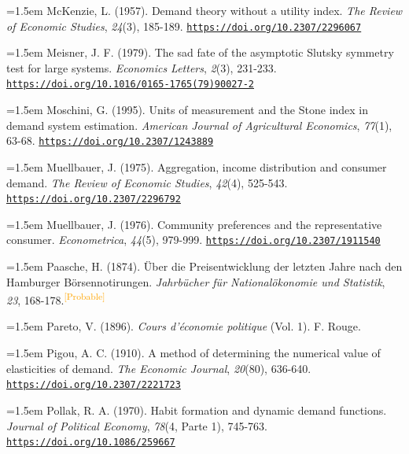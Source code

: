 \documentclass[10pt,a4paper]{article}
\begin{document}
\noindent\hangindent=1.5em McKenzie, L. (1957). Demand theory without a utility index. \textit{The Review of Economic Studies}, \textit{24}(3), 185-189. \href{https://doi.org/10.2307/2296067}{\nolinkurl{https://doi.org/10.2307/2296067}}

\noindent\hangindent=1.5em Meisner, J. F. (1979). The sad fate of the asymptotic Slutsky symmetry test for large systems. \textit{Economics Letters}, \textit{2}(3), 231-233. \href{https://doi.org/10.1016/0165-1765(79)90027-2}{\nolinkurl{https://doi.org/10.1016/0165-1765(79)90027-2}}

\noindent\hangindent=1.5em Moschini, G. (1995). Units of measurement and the Stone index in demand system estimation. \textit{American Journal of Agricultural Economics}, \textit{77}(1), 63-68. \href{https://doi.org/10.2307/1243889}{\nolinkurl{https://doi.org/10.2307/1243889}}

\noindent\hangindent=1.5em Muellbauer, J. (1975). Aggregation, income distribution and consumer demand. \textit{The Review of Economic Studies}, \textit{42}(4), 525-543. \href{https://doi.org/10.2307/2296792}{\nolinkurl{https://doi.org/10.2307/2296792}}

\noindent\hangindent=1.5em Muellbauer, J. (1976). Community preferences and the representative consumer. \textit{Econometrica}, \textit{44}(5), 979-999. \href{https://doi.org/10.2307/1911540}{\nolinkurl{https://doi.org/10.2307/1911540}}

\noindent\hangindent=1.5em Paasche, H. (1874). Über die Preisentwicklung der letzten Jahre nach den Hamburger Börsennotirungen. \textit{Jahrbücher für Nationalökonomie und Statistik}, \textit{23}, 168-178.\textcolor{orange}{\textsuperscript{[Probable]}}

\noindent\hangindent=1.5em Pareto, V. (1896). \textit{Cours d'économie politique} (Vol. 1). F. Rouge.

\noindent\hangindent=1.5em Pigou, A. C. (1910). A method of determining the numerical value of elasticities of demand. \textit{The Economic Journal}, \textit{20}(80), 636-640. \href{https://doi.org/10.2307/2221723}{\nolinkurl{https://doi.org/10.2307/2221723}}

\noindent\hangindent=1.5em Pollak, R. A. (1970). Habit formation and dynamic demand functions. \textit{Journal of Political Economy}, \textit{78}(4, Parte 1), 745-763. \href{https://doi.org/10.1086/259667}{\nolinkurl{https://doi.org/10.1086/259667}}
\end{document}
